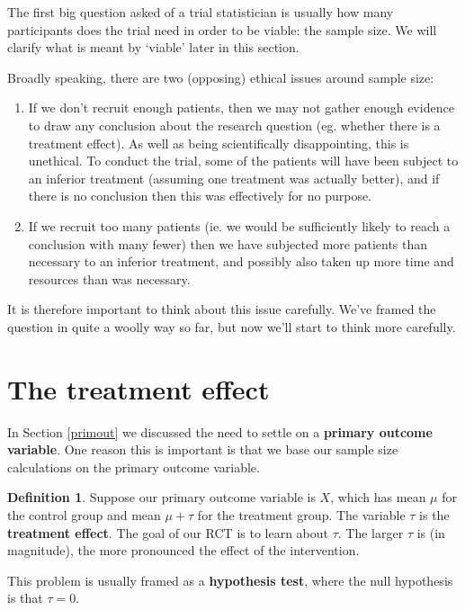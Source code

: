 \documentclass[
  openany]{book}
\providecommand{\tightlist}{%
  \setlength{\itemsep}{0pt}\setlength{\parskip}{0pt}}
\theoremstyle{definition}
\newtheorem{definition}{Definition}[chapter]
\theoremstyle{definition}
\theoremstyle{definition}
\theoremstyle{definition}
\theoremstyle{remark}
\begin{document}
The first big question asked of a trial statistician is usually how many participants does the trial need in order to be viable: the sample size. We will clarify what is meant by `viable' later in this section.

Broadly speaking, there are two (opposing) ethical issues around sample size:

\begin{enumerate}
\def\labelenumi{\arabic{enumi}.}
\tightlist
\item
  If we don't recruit enough patients, then we may not gather enough evidence to draw any conclusion about the research question (eg. whether there is a treatment effect). As well as being scientifically disappointing, this is unethical. To conduct the trial, some of the patients will have been subject to an inferior treatment (assuming one treatment was actually better), and if there is no conclusion then this was effectively for no purpose.
\item
  If we recruit too many patients (ie. we would be sufficiently likely to reach a conclusion with many fewer) then we have subjected more patients than necessary to an inferior treatment, and possibly also taken up more time and resources than was necessary.
\end{enumerate}

It is therefore important to think about this issue carefully. We've framed the question in quite a woolly way so far, but now we'll start to think more carefully.

\section{The treatment effect}\label{the-treatment-effect}

In Section \ref{primout} we discussed the need to settle on a \textbf{primary outcome variable}. One reason this is important is that we base our sample size calculations on the primary outcome variable.

\begin{definition}
Suppose our primary outcome variable is \(X\), which has mean \(\mu\) for the control group and mean \(\mu + \tau\) for the treatment group. The variable \(\tau\) is the \textbf{treatment effect}. The goal of our RCT is to learn about \(\tau\). The larger \(\tau\) is (in magnitude), the more pronounced the effect of the intervention.
\end{definition}

This problem is usually framed as a \textbf{hypothesis test}, where the null hypothesis is that \(\tau=0\).
\end{document}
